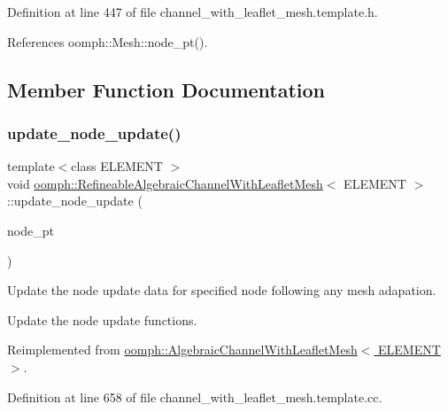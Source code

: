 Definition at line 447 of file channel\+\_\+with\+\_\+leaflet\+\_\+mesh.\+template.\+h.



References oomph\+::\+Mesh\+::node\+\_\+pt().



\subsection{Member Function Documentation}
\mbox{\label{classoomph_1_1RefineableAlgebraicChannelWithLeafletMesh_a8ee7168fbb84bb87880a2590dd52eaa8}} 
\subsubsection{\texorpdfstring{update\+\_\+node\+\_\+update()}{update\_node\_update()}}
{\footnotesize\ttfamily template$<$class E\+L\+E\+M\+E\+NT $>$ \\
void \hyperlink{classoomph_1_1RefineableAlgebraicChannelWithLeafletMesh}{oomph\+::\+Refineable\+Algebraic\+Channel\+With\+Leaflet\+Mesh}$<$ E\+L\+E\+M\+E\+NT $>$\+::update\+\_\+node\+\_\+update (\begin{DoxyParamCaption}\item[{\hyperlink{classoomph_1_1AlgebraicNode}{Algebraic\+Node} $\ast$\&}]{node\+\_\+pt }\end{DoxyParamCaption})\hspace{0.3cm}{\ttfamily [virtual]}}



Update the node update data for specified node following any mesh adapation. 

Update the node update functions. 

Reimplemented from \hyperlink{classoomph_1_1AlgebraicChannelWithLeafletMesh_ace3a90b4e530c75bec8301e2291151eb}{oomph\+::\+Algebraic\+Channel\+With\+Leaflet\+Mesh$<$ E\+L\+E\+M\+E\+N\+T $>$}.



Definition at line 658 of file channel\+\_\+with\+\_\+leaflet\+\_\+mesh.\+template.\+cc.



